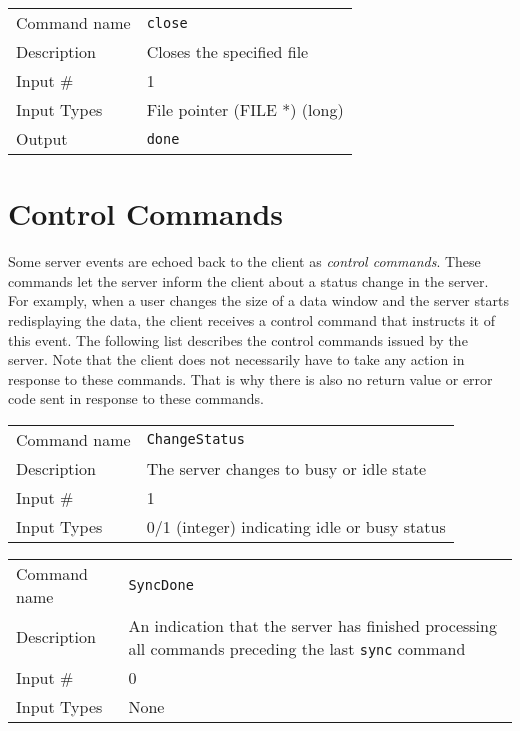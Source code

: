 \bigskip

\noindent
\begin{tabular}{l|p{5in}}
\hline
Command name & {\tt close} \\
Description  & Closes the specified file \\
Input \#     & 1 \\
Input Types  & File pointer (FILE *) (long) \\
Output       & {\tt done} \\
\hline
\end{tabular}

\section{Control Commands}

Some server events are echoed back to the client as {\em control
commands}. These commands let the server inform the client about a
status change in the server.  For examply, when a user changes the
size of a data window and the server starts redisplaying the data, the
client receives a control command that instructs it of this event. The
following list describes the control commands issued by the
server. Note that the client does not necessarily have to take any
action in response to these commands. That is why there is also no
return value or error code sent in response to these commands.

\bigskip

\noindent
\begin{tabular}{l|p{5in}}
\hline
Command name & {\tt ChangeStatus} \\
Description  & The server changes to busy or idle state \\
Input \#     & 1 \\
Input Types  & 0/1 (integer) indicating idle or busy status \\
\hline
\end{tabular}

\bigskip

\noindent
\begin{tabular}{l|p{5in}}
\hline
Command name & {\tt SyncDone} \\
Description  & An indication that the server has finished processing all
               commands preceding the last {\tt sync} command \\
Input \#     & 0 \\
Input Types  & None \\
\hline
\end{tabular}

